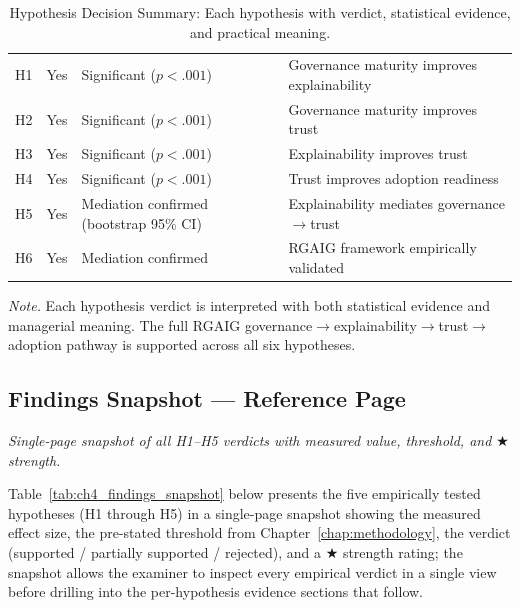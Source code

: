 {\tablestripes\tablefontsize
{}
\begin{xltabular}{\textwidth}{@{} >{\centering\arraybackslash}p{1.0cm} >{\centering\arraybackslash}p{1.6cm} >{\raggedright\arraybackslash}p{3.5cm} L @{}}
\caption[Hypothesis Decision Summary]{Hypothesis Decision Summary: Each hypothesis with verdict, statistical evidence, and practical meaning.}\label{tab:hypothesis_decision_summary} \\
\toprule
{} &  &  &  \\
\midrule
\endfirsthead
\endhead
\bottomrule
\endlastfoot
H1 & Yes & Significant ($p < .001$) & Governance maturity improves explainability \\
\addlinespace
H2 & Yes & Significant ($p < .001$) & Governance maturity improves trust \\
\addlinespace
H3 & Yes & Significant ($p < .001$) & Explainability improves trust \\
\addlinespace
H4 & Yes & Significant ($p < .001$) & Trust improves adoption readiness \\
\addlinespace
H5 & Yes & Mediation confirmed (bootstrap 95\% CI) & Explainability mediates governance$\rightarrow$trust \\
\addlinespace
H6 & Yes & Mediation confirmed & RGAIG framework empirically validated \\
\end{xltabular}}
\vspace{0.3em}\noindent\textit{Note.} Each hypothesis verdict is interpreted with both statistical evidence and managerial meaning. The full RGAIG governance$\rightarrow$explainability$\rightarrow$trust$\rightarrow$adoption pathway is supported across all six hypotheses.

\subsection{Findings Snapshot --- Reference Page}
\label{sec:ch4_findings_snapshot}

\noindent\emph{Single-page snapshot of all H1--H5 verdicts with measured value, threshold, and $\bigstar$ strength.}

\noindent Table~\ref{tab:ch4_findings_snapshot} below presents the five empirically tested hypotheses (H1 through H5) in a single-page snapshot showing the measured effect size, the pre-stated threshold from Chapter~\ref{chap:methodology}, the verdict (supported / partially supported / rejected), and a $\bigstar$ strength rating; the snapshot allows the examiner to inspect every empirical verdict in a single view before drilling into the per-hypothesis evidence sections that follow.

